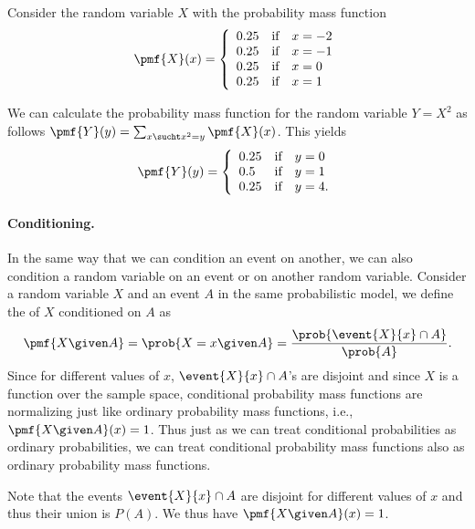 {\begin{example}
\end{example}

\begin{example}
Consider the random variable $X$ with the probability mass function 
\[
\pmf{X}(x) = 
\left\{
\begin{array}{lll}
0.25  & \mbox{if} & x = -2
\\
0.25  & \mbox{if} & x = -1
\\
0.25  & \mbox{if} & x = 0
\\
0.25  & \mbox{if} & x = 1
\end{array}
\right.
\]

We can calculate the probability mass function for the random variable
$Y = X^2$ as follows $\pmf{Y}(y) = \sum_{x \sucht x^2 =
  y}\pmf{X}(x)$.
%
This yields
\[
\pmf{Y}(y) = 
\left\{
\begin{array}{lll}
0.25  & \mbox{if} & y = 0
\\
0.5  & \mbox{if} & y = 1
\\
0.25  & \mbox{if} & y = 4.
\end{array}
\right.
\]

\end{example}

\paragraph{Conditioning.}

In the same way that we can condition an event on another, we can also
condition a random variable on an event or on another random variable.
%
Consider a random variable $X$ and an event $A$ in the same probabilistic
model, we define the  of
$X$ conditioned on  $A$ as 
\[
\pmf{X \given A} = \prob{X = x \given A} = \frac{\prob{\event{X}{x} \cap A}}{\prob{A}}.
\]
%
Since for different values of $x$, $\event{X}{x} \cap A$'s are
disjoint and since $X$ is a function over the sample space,
conditional probability mass functions are normalizing just like
ordinary probability mass functions, i.e., $\pmf{X \given A}(x) = 1$.
%
Thus just as we can treat conditional probabilities as ordinary
probabilities, we can treat conditional probability  mass functions
also as ordinary probability mass functions.

\begin{notesonly}
Note that the events $\event{X}{x} \cap A$ are disjoint for different
values of $x$ and thus their union is $P(A)$.  We thus have $\pmf{X
  \given A}(x) = 1$.
\end{notesonly}

}
